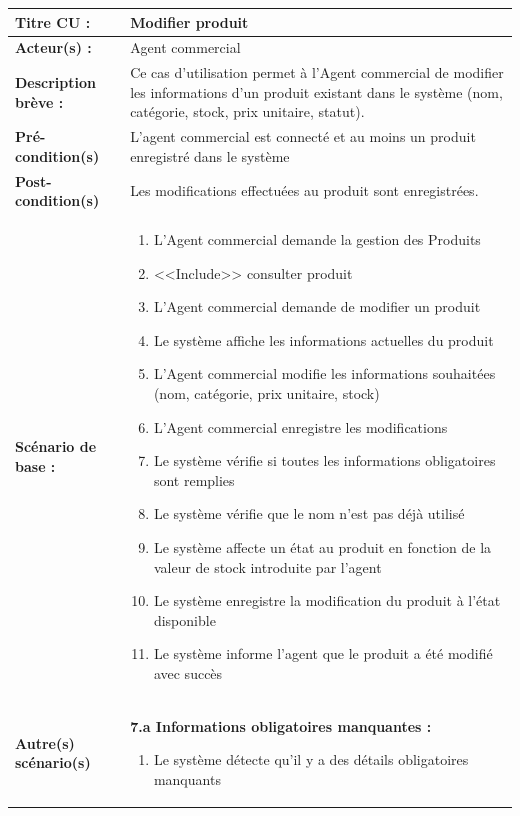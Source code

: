 \begin{table}[H]
\footnotesize
\renewcommand{\arraystretch}{0.88}
\begin{tabularx}{\textwidth}{|p{3.4cm}|X|}
\hline
\textbf{Titre CU :} & Modifier produit \\
\hline
\textbf{Acteur(s) :} & Agent commercial \\
\hline
\textbf{Description brève :} & Ce cas d’utilisation permet à l’Agent commercial de modifier les informations d’un produit existant dans le système (nom, catégorie, stock, prix unitaire, statut). \\
\hline
\textbf{Pré-condition(s)} & L’agent commercial est connecté et au moins un produit enregistré dans le système \\
\hline
\textbf{Post-condition(s)} & Les modifications effectuées au produit sont enregistrées. \\
\hline
\textbf{Scénario de base :} &
\begin{enumerate}[leftmargin=1.5em, topsep=1pt, itemsep=0pt]
  \item L’Agent commercial demande la gestion des Produits
  \item <<Include>> consulter produit
  \item L’Agent commercial demande de modifier un produit
  \item Le système affiche les informations actuelles du produit
  \item L’Agent commercial modifie les informations souhaitées (nom, catégorie, prix unitaire, stock)
  \item L’Agent commercial enregistre les modifications
  \item Le système vérifie si toutes les informations obligatoires sont remplies
  \item Le système vérifie que le nom n’est pas déjà utilisé
  \item Le système affecte un état au produit en fonction de la valeur de stock introduite par l’agent
  \item Le système enregistre la modification du produit à l’état disponible
  \item Le système informe l’agent que le produit a été modifié avec succès
\end{enumerate} \\
\hline
\textbf{Autre(s) scénario(s)} &
\textbf{7.a Informations obligatoires manquantes :}
\begin{enumerate}[leftmargin=1.5em, topsep=1pt, itemsep=0pt]
  \item Le système détecte qu’il y a des détails obligatoires manquants

\end{enumerate}
\end{tabularx}
\end{table}
